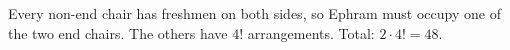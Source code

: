 Every non-end chair has freshmen on both sides, so Ephram must occupy one of the two end chairs. The others have $4!$ arrangements. Total: $2\cdot4!=\boxed{48}$.
